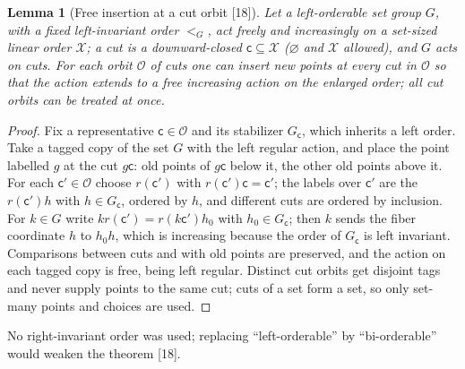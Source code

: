 \documentclass[11pt,oneside]{article}
\numberwithin{equation}{section}
\newtheorem{lemma}[lemma]{Lemma}
\theoremstyle{definition}
\theoremstyle{remark}
\newcommand{\src}[1]{\textup{\textsf{\small[#1]}}}
\begin{document}
\begin{lemma}[Free insertion at a cut orbit \src{18}]\label{opa:es:lem:cutinsert}
Let a left-orderable set group $G$, with a fixed left-invariant order $<_G$, act freely and increasingly on a set-sized linear order
$\mathcal X$; a cut is a downward-closed $\mathsf c\subseteq\mathcal X$ ($\varnothing$ and $\mathcal X$ allowed), and $G$ acts on cuts. For
each orbit $\mathcal O$ of cuts one can insert new points at every cut in $\mathcal O$ so that the action extends to a free increasing
action on the enlarged order; all cut orbits can be treated at once.
\end{lemma}
\begin{proof}
Fix a representative $\mathsf c\in\mathcal O$ and its stabilizer $G_{\mathsf c}$, which inherits a left order. Take a tagged copy of the
set $G$ with the left regular action, and place the point labelled $g$ at the cut $g\mathsf c$: old points of $g\mathsf c$ below it, the
other old points above it. For each $\mathsf c'\in\mathcal O$ choose $r(\mathsf c')$ with $r(\mathsf c')\mathsf c=\mathsf c'$; the labels over $\mathsf c'$
are the $r(\mathsf c')h$ with $h\in G_{\mathsf c}$, ordered by $h$, and different cuts are ordered by inclusion. For $k\in G$ write
$kr(\mathsf c')=r(k\mathsf c')h_0$ with $h_0\in G_{\mathsf c}$; then $k$ sends the fiber coordinate $h$ to $h_0h$, which is increasing because
the order of $G_{\mathsf c}$ is left invariant. Comparisons between cuts and with old points are preserved, and the action on each tagged
copy is free, being left regular. Distinct cut orbits get disjoint tags and never supply points to the same cut; cuts of a set form a
set, so only set-many points and choices are used.
\end{proof}

No right-invariant order was used; replacing ``left-orderable'' by ``bi-orderable'' would weaken the theorem \src{18}.
\end{document}
